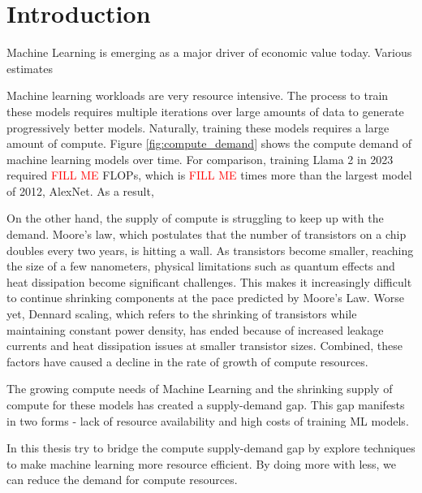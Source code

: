 \chapter{Introduction}
\label{ch_intro}

\newcommand{\fillme}{\textcolor{red}{FILL ME}}

Machine Learning is emerging as a major driver of economic value today. Various estimates 

Machine learning workloads are very resource intensive. The process to train these models requires multiple iterations over large amounts of data to generate progressively better models. Naturally, training these models requires a large amount of compute. Figure \ref{fig:compute_demand} shows the compute demand of machine learning models over time. For comparison, training Llama 2 in 2023 required \fillme{} FLOPs, which is \fillme{} times more than the largest model of 2012, AlexNet. As a result, 

On the other hand, the supply of compute is struggling to keep up with the demand. Moore's law, which postulates that the number of transistors on a chip doubles every two years, is hitting a wall. As transistors become smaller, reaching the size of a few nanometers, physical limitations such as quantum effects and heat dissipation become significant challenges. This makes it increasingly difficult to continue shrinking components at the pace predicted by Moore's Law. Worse yet, Dennard scaling, which refers to the shrinking of transistors while maintaining constant power density, has ended because of increased leakage currents and heat dissipation issues at smaller transistor sizes. Combined, these factors have caused a decline in the rate of growth of compute resources.

The growing compute needs of Machine Learning and the shrinking supply of compute for these models has created a supply-demand gap. This gap manifests in two forms - lack of resource availability and high costs of training ML models. 

In this thesis try to bridge the compute supply-demand gap by explore techniques to make machine learning more resource efficient. By doing more with less, we can reduce the demand for compute resources. 

